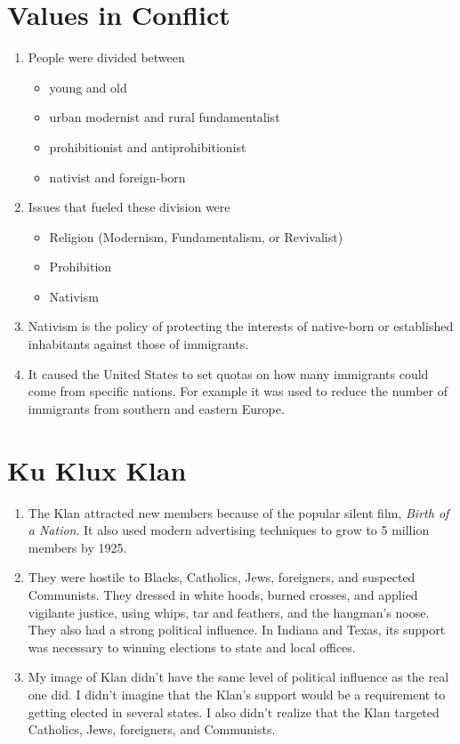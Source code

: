 \documentclass[12pt]{article} %
\begin{document}
\section{Values in Conflict}
\begin{enumerate}
	\item People were divided between 
	\begin{itemize}
		\item young and old 
		\item urban modernist and rural fundamentalist
		\item prohibitionist and antiprohibitionist
		\item nativist and foreign-born
	\end{itemize}
	\item Issues that fueled these division were 
	\begin{itemize}
		\item Religion (Modernism, Fundamentalism, or Revivalist)
		\item Prohibition
		\item Nativism 
	\end{itemize}
	\item Nativism is the policy of protecting the interests of native-born or established inhabitants against those
		of immigrants. 
	\item It caused the United States to set quotas on how many immigrants could come from specific 
		nations. For example it was used to reduce the number of immigrants from southern and eastern Europe.
\end{enumerate}

\section{Ku Klux Klan}
\begin{enumerate}
	\item The Klan attracted new members because of the popular silent film, \textit{Birth of a Nation}. It also used
		modern advertising techniques to grow to 5 million members by 1925.
	\item They were hostile to Blacks, Catholics, Jews, foreigners, and suspected Communists. They dressed in white 
		hoods, burned crosses, and applied vigilante justice, using whips, tar and feathers, and the hangman's noose.
		They also had a strong political influence. In Indiana and Texas, its support was necessary to winning elections
		to state and local offices.
	\item My image of Klan didn't have the same level of political influence as the real one did. I didn't imagine that
		the Klan's support would be a requirement to getting elected in several states. I also didn't realize that the 
		Klan targeted Catholics, Jews, foreigners, and Communists.
\end{enumerate}
\end{document}
